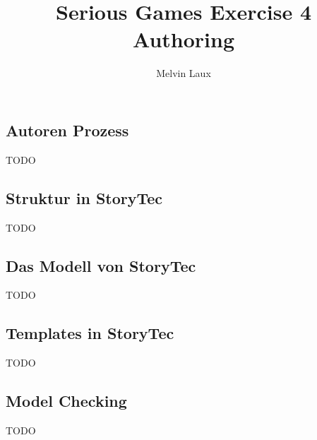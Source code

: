 \documentclass[accentcolor=tud9c,german,colorbacktitle,inverttitle]{tudexercise}
\author{Melvin Laux}
\title{Serious Games Exercise 4 \\ Authoring}
\begin{document}
	\maketitle

\setcounter{section}{2}	
\subsection{Autoren Prozess}
TODO

\subsection{Struktur in StoryTec}
TODO

\subsection{Das Modell von StoryTec}
TODO

\subsection{Templates in StoryTec}
TODO

\subsection{Model Checking}
TODO
\end{document}

